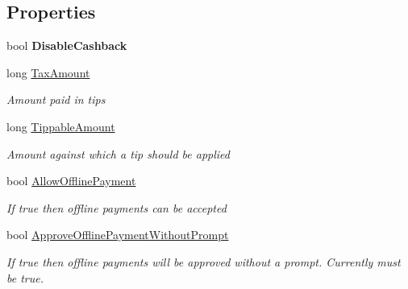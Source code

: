 \subsection*{Properties}
\begin{DoxyCompactItemize}
\item 
\mbox{\label{classcom_1_1clover_1_1remotepay_1_1sdk_1_1_auth_request_acd92e15928d39787729933da4400ee6b}} 
bool {\bfseries Disable\+Cashback}
\item 
long \hyperlink{classcom_1_1clover_1_1remotepay_1_1sdk_1_1_auth_request_ad23ebdcb14edcb4eb99b0572350905c6}{Tax\+Amount}
\begin{DoxyCompactList}\small\item\em Amount paid in tips \end{DoxyCompactList}\item 
long \hyperlink{classcom_1_1clover_1_1remotepay_1_1sdk_1_1_auth_request_a2f3e3450ac6bc785023926590bf4c468}{Tippable\+Amount}
\begin{DoxyCompactList}\small\item\em Amount against which a tip should be applied \end{DoxyCompactList}\item 
bool \hyperlink{classcom_1_1clover_1_1remotepay_1_1sdk_1_1_auth_request_afaafa0e18fed556cc3cd6ca9906630b2}{Allow\+Offline\+Payment}
\begin{DoxyCompactList}\small\item\em If true then offline payments can be accepted \end{DoxyCompactList}\item 
bool \hyperlink{classcom_1_1clover_1_1remotepay_1_1sdk_1_1_auth_request_aa1e83e887f5d3db97e7ae9810bb63e08}{Approve\+Offline\+Payment\+Without\+Prompt}
\begin{DoxyCompactList}\small\item\em If true then offline payments will be approved without a prompt. Currently must be true. \end{DoxyCompactList}\item 

\end{DoxyCompactItemize}
